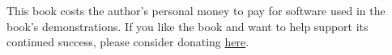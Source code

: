 This book costs the author's personal money to pay for software used in the
book's demonstrations. If you like the book and want to help support its
continued success, please consider donating
\href{https://www.paypal.com/cgi-bin/webscr?cmd=_donations&business=KA9QZVDMVYN26&lc=US&item_name=Evolving\%20Technology\%20Study\%20Guide&item_number=42518&currency_code=USD&bn=PP\%2dDonationsBF\%3abtn_donate_LG\%2egif\%3aNonHosted}{here}.
